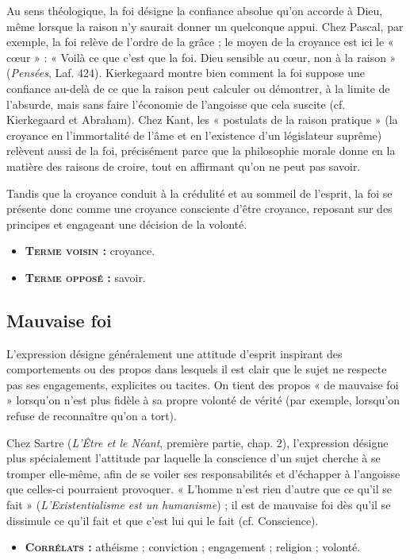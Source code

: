 Au sens théologique, la foi désigne la
confiance absolue qu'on accorde à
Dieu, même lorsque la raison n'y saurait
donner un quelconque appui. Chez
Pascal, par exemple, la foi relève de
l'ordre de la grâce ; le moyen de la
croyance est ici le « cœur » : « Voilà ce
que c’est que la foi. Dieu sensible au
cœur, non à la raison » ({\it Pensées}, Laf.
424). Kierkegaard montre bien
comment la foi suppose une confiance
au-delà de ce que la raison peut calculer
ou démontrer, à la limite de
l’absurde, mais sans faire l’économie
de l’angoisse que cela suscite (cf. Kierkegaard
et Abraham). Chez Kant, les
« postulats de la raison pratique » (la
croyance en l'immortalité de l'âme et
en l'existence d'un législateur
suprême) relèvent aussi de la foi, précisément
parce que la philosophie
morale donne en la matière des raisons
de croire, tout en affirmant qu’on ne
peut pas savoir.

Tandis que la croyance conduit à la
crédulité et au sommeil de l'esprit, la
foi se présente donc comme une
croyance consciente d’être croyance,
reposant sur des principes et engageant
une décision de la volonté.

\begin{itemize}[leftmargin=1cm, label=, itemsep=1pt]
\item {\bf \textsc{Terme voisin} :} croyance.
\item {\bf \textsc{Terme opposé} :} savoir.
\end{itemize}

\subsection{Mauvaise foi}

L'expression désigne généralement une
attitude d’esprit inspirant des comportements
ou des propos dans lesquels il est
clair que le sujet ne respecte pas ses
engagements, explicites ou tacites. On
tient des propos « de mauvaise foi » lorsqu'on
n'est plus fidèle à sa propre
volonté de vérité (par exemple, lorsqu'on
refuse de reconnaître qu’on a
tort).

Chez Sartre ({\it L'Être et le Néant}, première
partie, chap. 2), l'expression désigne
plus spécialement l'attitude par laquelle
la conscience d’un sujet cherche à se
tromper elle-même, afin de se voiler ses
responsabilités et d'échapper à l'angoisse
que celles-ci pourraient provoquer.
« L'homme n'est rien d'autre que
ce qu'il se fait » ({\it L'Existentialisme est un
humanisme}) ; il est de mauvaise foi dès
qu'il se dissimule ce qu'il fait et que c’est
lui qui le fait (cf. Conscience).

\begin{itemize}[leftmargin=1cm, label=, itemsep=1pt]
\item {\bf \textsc{Corrélats} :} athéisme ; conviction ;
engagement ; religion ;
volonté.
\end{itemize}

